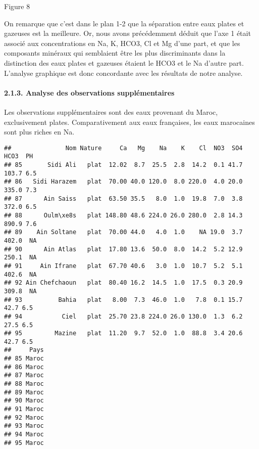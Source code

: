 \documentclass[]{article}
\let\oldparagraph\paragraph
\renewcommand{\paragraph}[1]{\oldparagraph{#1}\mbox{}}
\begin{document}
Figure 8

 On remarque que c'est dans le plan 1-2 que la séparation entre eaux
plates et gazeuses est la meilleure. Or, nous avons précédemment déduit
que l'axe 1 était associé aux concentrations en Na, K, HCO3, Cl et Mg
d'une part, et que les composants minéraux qui semblaient être les plus
discriminants dans la distinction des eaux plates et gazeuses étaient le
HCO3 et le Na d'autre part. L'analyse graphique est donc concordante
avec les résultats de notre analyse.

\hypertarget{analyse-des-observations-supplementaires}{\paragraph{2.1.3.
Analyse des observations
supplémentaires}\label{analyse-des-observations-supplementaires}}

Les observations supplémentaires sont des eaux provenant du Maroc,
exclusivement plates. Comparativement aux eaux françaises, les eaux
marocaines sont plus riches en Na.

\begin{verbatim}
##               Nom Nature     Ca   Mg    Na    K    Cl  NO3  SO4  HCO3  PH
## 85       Sidi Ali   plat  12.02  8.7  25.5  2.8  14.2  0.1 41.7 103.7 6.5
## 86   Sidi Harazem   plat  70.00 40.0 120.0  8.0 220.0  4.0 20.0 335.0 7.3
## 87      Ain Saiss   plat  63.50 35.5   8.0  1.0  19.8  7.0  3.8 372.0 6.5
## 88      Oulm\xe8s   plat 148.80 48.6 224.0 26.0 280.0  2.8 14.3 890.9 7.6
## 89    Ain Soltane   plat  70.00 44.0   4.0  1.0    NA 19.0  3.7 402.0  NA
## 90      Ain Atlas   plat  17.80 13.6  50.0  8.0  14.2  5.2 12.9 250.1  NA
## 91     Ain Ifrane   plat  67.70 40.6   3.0  1.0  10.7  5.2  5.1 402.6  NA
## 92 Ain Chefchaoun   plat  80.40 16.2  14.5  1.0  17.5  0.3 20.9 309.8  NA
## 93          Bahia   plat   8.00  7.3  46.0  1.0   7.8  0.1 15.7  42.7 6.5
## 94           Ciel   plat  25.70 23.8 224.0 26.0 130.0  1.3  6.2  27.5 6.5
## 95         Mazine   plat  11.20  9.7  52.0  1.0  88.8  3.4 20.6  42.7 6.5
##     Pays
## 85 Maroc
## 86 Maroc
## 87 Maroc
## 88 Maroc
## 89 Maroc
## 90 Maroc
## 91 Maroc
## 92 Maroc
## 93 Maroc
## 94 Maroc
## 95 Maroc
\end{verbatim}
\end{document}
